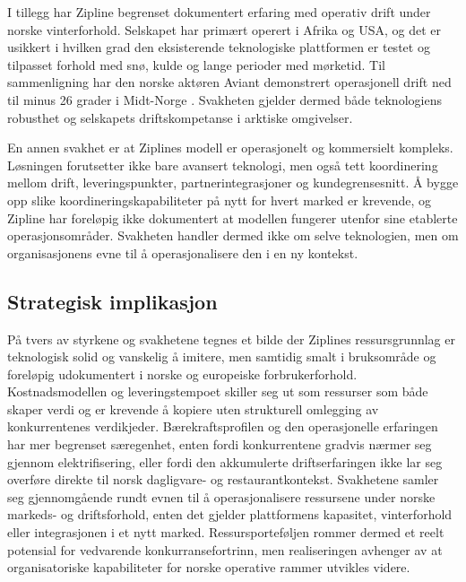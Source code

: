 I tillegg har Zipline begrenset dokumentert erfaring med operativ drift
under norske vinterforhold. Selskapet har primært operert i
Afrika og USA, og det er usikkert i hvilken grad den eksisterende
teknologiske plattformen er testet og tilpasset forhold med snø, kulde og
lange perioder med mørketid. Til sammenligning har den norske aktøren
Aviant demonstrert operasjonell drift ned til minus 26 grader i Midt-Norge
\parencite{aviant2024}. Svakheten gjelder dermed både teknologiens
robusthet og selskapets driftskompetanse i arktiske omgivelser.

En annen svakhet er at Ziplines modell er operasjonelt og kommersielt
kompleks. Løsningen forutsetter ikke bare avansert teknologi, men også tett
koordinering mellom drift, leveringspunkter, partnerintegrasjoner og
kundegrensesnitt. Å bygge opp slike koordineringskapabiliteter på nytt for
hvert marked er krevende, og Zipline har foreløpig ikke dokumentert at
modellen fungerer utenfor sine etablerte operasjonsområder. Svakheten
handler dermed ikke om selve teknologien, men om organisasjonens evne til å
operasjonalisere den i en ny kontekst.

\subsection{Strategisk implikasjon}
På tvers av styrkene og svakhetene tegnes et bilde der Ziplines
ressursgrunnlag er teknologisk solid og vanskelig å imitere, men samtidig
smalt i bruksområde og foreløpig udokumentert i norske og europeiske
forbrukerforhold. Kostnadsmodellen og leveringstempoet skiller seg ut som
ressurser som både skaper verdi og er krevende å kopiere uten strukturell
omlegging av konkurrentenes verdikjeder. Bærekraftsprofilen og den
operasjonelle erfaringen har mer begrenset særegenhet, enten fordi
konkurrentene gradvis nærmer seg gjennom elektrifisering, eller fordi den
akkumulerte driftserfaringen ikke lar seg overføre direkte til norsk
dagligvare- og restaurantkontekst. Svakhetene samler seg gjennomgående
rundt evnen til å operasjonalisere ressursene under norske markeds- og
driftsforhold, enten
det gjelder plattformens kapasitet, vinterforhold eller integrasjonen i et
nytt marked. Ressursporteføljen rommer dermed et reelt potensial for
vedvarende konkurransefortrinn, men realiseringen avhenger av at
organisatoriske kapabiliteter for norske operative rammer utvikles videre.
